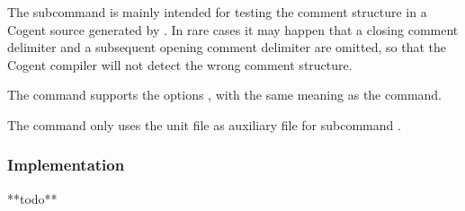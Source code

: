 The subcommand  is mainly intended for testing the comment structure in a Cogent source generated by
. In rare cases it may happen that a closing comment delimiter and a subsequent opening comment delimiter
are omitted, so that the Cogent compiler will not detect the wrong comment structure.

The  command supports the options ,  with the same meaning as
the  command.

The  command only uses the unit file  as auxiliary file for subcommand .

\subsubsection{Implementation}

**todo**

